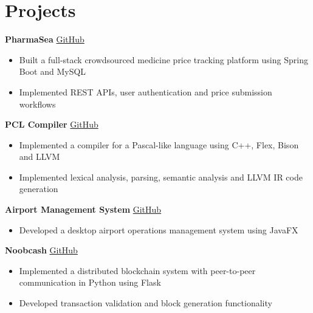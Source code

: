 \documentclass[11pt]{article}       %
\begin{document}
\vspace{-18.5pt}

\section*{Projects}

\textbf{PharmaSea} \hfill \href{https://github.com/Nickgraviton/pharmasea}{GitHub} \\
\vspace{-9pt}
\begin{itemize}
  \item Built a full-stack crowdsourced medicine price tracking platform using Spring Boot and MySQL
  \item Implemented REST APIs, user authentication and price submission workflows
\end{itemize}

\textbf{PCL Compiler} \hfill \href{https://github.com/Nickgraviton/pcl-compiler}{GitHub} \\
\vspace{-9pt}
\begin{itemize}
  \item Implemented a compiler for a Pascal-like language using C++, Flex, Bison and LLVM
  \item Implemented lexical analysis, parsing, semantic analysis and LLVM IR code generation
\end{itemize}

\textbf{Airport Management System} \hfill \href{https://github.com/Nickgraviton/airport-management-system}{GitHub} \\
\vspace{-9pt}
\begin{itemize}
  \item Developed a desktop airport operations management system using JavaFX
\end{itemize}

\textbf{Noobcash} \hfill \href{https://github.com/Nickgraviton/noobcash}{GitHub} \\
\vspace{-9pt}
\begin{itemize}
  \item Implemented a distributed blockchain system with peer-to-peer communication in Python using Flask
  \item Developed transaction validation and block generation functionality
\end{itemize}
\end{document}
